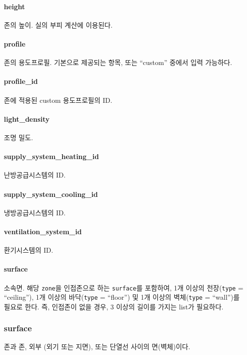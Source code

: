 \paragraph{height} 존의 높이. 실의 부피 계산에 이용된다.

\paragraph{profile} 존의 용도프로필. 기본으로 제공되는 항목, 또는 ``custom'' 중에서 입력 가능하다. 

\paragraph{profile\_id} 존에 적용된 custom 용도프로필의 ID. 

\paragraph{light\_density} 조명 밀도.

\paragraph{supply\_system\_heating\_id} 난방공급시스템의 ID. 

\paragraph{supply\_system\_cooling\_id} 냉방공급시스템의 ID.

\paragraph{ventilation\_system\_id} 환기시스템의 ID.

\paragraph{surface} 소속면. 해당 \texttt{zone}을 인접존으로 하는 \texttt{surface}를 포함하여, 1개 이상의 천장(\texttt{type} = ``ceiling''), 1개 이상의 바닥(\texttt{type} = ``floor'') 및 1개 이상의 벽체(\texttt{type} = ``wall'')를 필요로 한다. 즉, 인접존이 없을 경우, 3 이상의 길이를 가지는 list가 필요하다.

\subsubsection{surface} \label{subsubsection:ioref:surface}
존과 존, 외부 (외기 또는 지면), 또는 단열선 사이의 면(벽체)이다.

